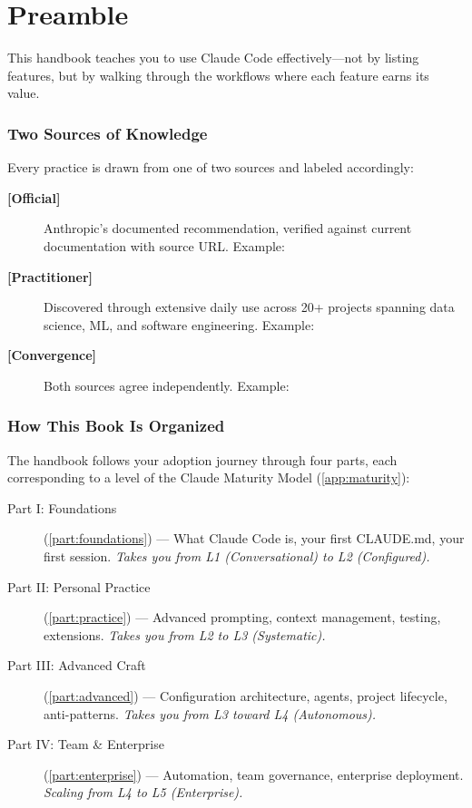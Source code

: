 \chapter*{Preamble}
\label{ch:preamble}

This handbook teaches you to use Claude Code effectively---not by listing
features, but by walking through the workflows where each feature earns its value.

\subsection*{Two Sources of Knowledge}

Every practice is drawn from one of two sources and labeled accordingly:

\begin{description}
  \item[{\color{WarmPlum}\textbf{[Official]}}] Anthropic's documented recommendation,
    verified against current documentation with source URL.
    Example: 
  \item[{\color{WarmGreen}\textbf{[Practitioner]}}] Discovered through extensive daily use
    across 20+ projects spanning data science, ML, and software engineering.
    Example: 
  \item[{\color{WarmGold}\textbf{[Convergence]}}] Both sources agree independently.
    Example: 
\end{description}

\subsection*{How This Book Is Organized}

The handbook follows your adoption journey through four parts,
each corresponding to a level of the Claude Maturity Model (\cref{app:maturity}):

\begin{description}
  \item[Part I: Foundations] (\cref{part:foundations}) ---
    What Claude Code is, your first CLAUDE.md, your first session.
    \emph{Takes you from L1 (Conversational) to L2 (Configured).}
  \item[Part II: Personal Practice] (\cref{part:practice}) ---
    Advanced prompting, context management, testing, extensions.
    \emph{Takes you from L2 to L3 (Systematic).}
  \item[Part III: Advanced Craft] (\cref{part:advanced}) ---
    Configuration architecture, agents, project lifecycle, anti-patterns.
    \emph{Takes you from L3 toward L4 (Autonomous).}
  \item[Part IV: Team \& Enterprise] (\cref{part:enterprise}) ---
    Automation, team governance, enterprise deployment.
    \emph{Scaling from L4 to L5 (Enterprise).}
\end{description}

